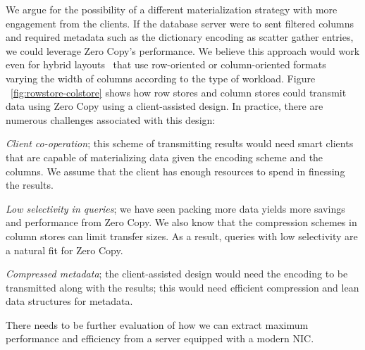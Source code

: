 We argue for the possibility of a different materialization strategy with more engagement from the 
clients. If the database server were to sent filtered columns and required metadata such as the 
dictionary encoding as scatter gather entries, we could leverage Zero Copy's performance. We believe 
this approach would work even for hybrid layouts~\cite{hyrise-hybridstores} that use row-oriented or 
column-oriented formats varying the width of columns according to the type of workload. Figure ~\ref{fig:rowstore-colstore}
shows how row stores and column stores could transmit data using Zero Copy using a client-assisted design.
In practice, there are numerous challenges associated with this design:
\begin{myitemize}
\item {\em Client co-operation}; this scheme of transmitting results would need smart clients that are 
capable of materializing data given the encoding scheme and the columns. We assume that the client 
has enough resources to spend in finessing the results.
\item {\em Low selectivity in queries}; we have seen packing more data yields more savings and performance 
from Zero Copy. We also know that the compression schemes in column stores can limit transfer sizes. 
As a result, queries with low selectivity are a natural fit for Zero Copy.
\item {\em Compressed metadata}; the client-assisted design would need the encoding to be transmitted
along with the results; this would need efficient compression and lean data structures for metadata.
\end{myitemize}
There needs to be further evaluation of how we can extract maximum performance and efficiency from 
a server equipped with a modern NIC.
\newline


